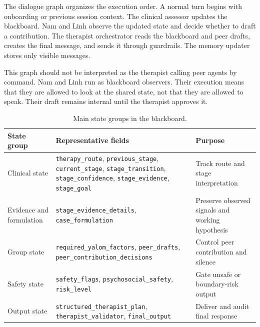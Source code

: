 The dialogue graph organizes the execution order. A normal turn begins with onboarding or previous session context. The clinical assessor updates the blackboard. Nam and Linh observe the updated state and decide whether to draft a contribution. The therapist orchestrator reads the blackboard and peer drafts, creates the final message, and sends it through guardrails. The memory updater stores only visible messages.

This graph should not be interpreted as the therapist calling peer agents by command. Nam and Linh run as blackboard observers. Their execution means that they are allowed to look at the shared state, not that they are allowed to speak. Their draft remains internal until the therapist approves it.

\begin{table}[tb]
\centering
\caption{Main state groups in the blackboard.}
\label{tab:blackboard_state}
\scriptsize
\begin{tabular}{p{}p{}p{}}
\toprule
State group & Representative fields & Purpose \\
\midrule
Clinical state & \texttt{therapy\_route}, \texttt{previous\_stage}, \texttt{current\_stage}, \texttt{stage\_transition}, \texttt{stage\_confidence}, \texttt{stage\_evidence}, \texttt{stage\_goal} & Track route and stage interpretation \\
Evidence and formulation & \texttt{stage\_evidence\_details}, \texttt{case\_formulation} & Preserve observed signals and working hypothesis \\
Group state & \texttt{required\_yalom\_factors}, \texttt{peer\_drafts}, \texttt{peer\_contribution}\newline\texttt{\_decisions} & Control peer contribution and silence \\
Safety state & \texttt{safety\_flags}, \texttt{psychosocial\_safety}, \texttt{risk\_level} & Gate unsafe or boundary-risk output \\
Output state & \texttt{structured\_therapist\_plan}, \texttt{therapist\_validator}, \texttt{final\_output} & Deliver and audit final response \\
\bottomrule
\end{tabular}
\end{table}

